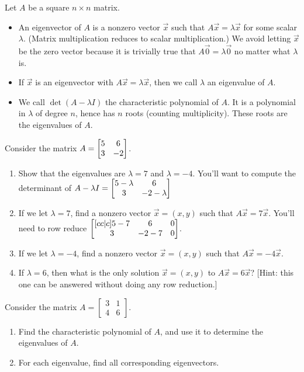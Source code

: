 \begin{definition}
Let $A$ be a square $n\times n$ matrix. 
\begin{itemize}
 \item An eigenvector of $A$ is a nonzero vector $\vec x$ such that $A\vec x =\lambda \vec x$ for some scalar {$\lambda$}. (Matrix multiplication reduces to scalar multiplication.) We avoid letting $\vec x$ be the zero vector because it is trivially true that $A\vec 0=\lambda \vec 0$ no matter what $\lambda$ is.
 \item If $\vec x$ is an eigenvector with $A\vec x = \lambda \vec x$, then we call $\lambda$ an eigenvalue of $A$.
 \item We call $\det(A-\lambda I)$ the characteristic polynomial of $A$.  It is a polynomial in $\lambda$ of degree $n$, hence has $n$ roots (counting multiplicity).  These roots are the eigenvalues of $A$.
\end{itemize}
\end{definition}




\begin{problem}
 Consider the matrix $A=\begin{bmatrix} 5&6\\3&-2 \end{bmatrix}$. 
\begin{enumerate}
 \item Show that the eigenvalues are $\lambda = 7$ and $\lambda = -4$. You'll want to compute the determinant of $A-\lambda I = \begin{bmatrix} 5-\lambda&6\\3&-2-\lambda \end{bmatrix}$
 \item If we let $\lambda = 7$, find a nonzero vector $\vec x = (x,y)$ such that $A\vec x = 7\vec x$. You'll need to row reduce $\begin{bmatrix} [cc|c]5-7&6&0\\3&-2-7&0 \end{bmatrix}$.  
 \item If we let $\lambda = -4$, find a nonzero vector $\vec x = (x,y)$ such that $A\vec x = -4\vec x$.  
 \item If $\lambda = 6$, then what is the only solution $\vec x = (x,y)$ to $A\vec x = 6\vec x$? [Hint: this one can be answered without doing any row reduction.] 
\end{enumerate}

\end{problem}


\begin{problem}
Consider the matrix 
$A=
\begin{bmatrix}
 3 & 1 \\
 4 & 6
\end{bmatrix}
$.
 \begin{enumerate}
 \item Find the characteristic polynomial of $A$, and use it to determine the eigenvalues of $A$. 
 \item For each eigenvalue, find all corresponding eigenvectors. 
\end{enumerate}
\end{problem}




